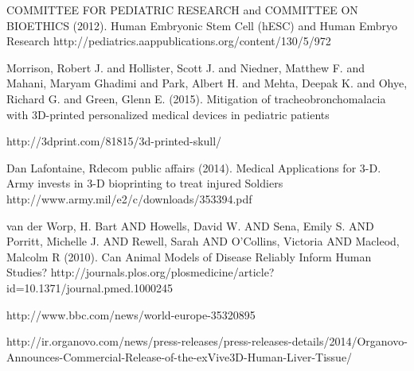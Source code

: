 \documentclass[12pt]{article} %
\begin{document}
\begin{thebibliography}{99}
\begin{small}
\newblock COMMITTEE FOR PEDIATRIC RESEARCH and COMMITTEE ON BIOETHICS (2012).
\newline Human Embryonic Stem Cell (hESC) and Human Embryo Research
\newblock http://pediatrics.aappublications.org/content/130/5/972

\newblock Morrison, Robert J. and Hollister, Scott J. and Niedner, Matthew F. and Mahani, Maryam Ghadimi and Park, Albert H. and Mehta, Deepak K. and Ohye, Richard G. and Green, Glenn E. (2015).
\newline Mitigation of tracheobronchomalacia with 3D-printed personalized medical devices in pediatric patients

\newblock http://3dprint.com/81815/3d-printed-skull/

\newblock Dan Lafontaine, Rdecom public affairs (2014).
\newline Medical Applications for 3-D. Army invests in 3-D bioprinting to treat injured Soldiers
\newblock http://www.army.mil/e2/c/downloads/353394.pdf

\newblock van der Worp, H. Bart AND Howells, David W. AND Sena, Emily S. AND Porritt, Michelle J. AND Rewell, Sarah AND O'Collins, Victoria AND Macleod, Malcolm R
(2010). 
\newline Can Animal Models of Disease Reliably Inform Human Studies?
\newblock http://journals.plos.org/plosmedicine/article?id=10.1371/journal.pmed.1000245

\newblock http://www.bbc.com/news/world-europe-35320895

\newblock http://ir.organovo.com/news/press-releases/press-releases-details/2014/Organovo-Announces-Commercial-Release-of-the-exVive3D-Human-Liver-Tissue/


\end{small}
\end{thebibliography}
\end{document}
